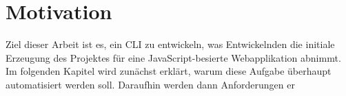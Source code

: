\section{Motivation}
Ziel dieser Arbeit ist es, ein \gls{CLI} zu entwickeln, was Entwickelnden die initiale Erzeugung des Projektes für eine JavaScript-besierte Webapplikation abnimmt. Im folgenden Kapitel wird zunächst erklärt, warum diese Aufgabe überhaupt automatisiert werden soll. Daraufhin werden dann Anforderungen er